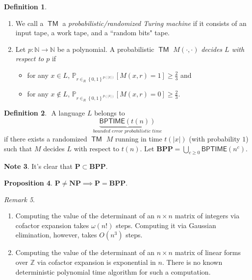 \documentclass[10pt,letterpaper,cm]{nupset}
\theoremstyle{definition}
\newtheorem{definition}{Definition}[subsection]
\newtheorem{note}[definition]{Note}
\theoremstyle{theorem}
\newtheorem{prop}[definition]{Proposition}
\theoremstyle{remark}
\newtheorem{remark}[definition]{Remark}
\newcommand{\N}{\mathbb N}
\newcommand{\Z}{\mathbb Z}
\newcommand{\1}{\mathbf{1}}
\newcommand{\0}{\vec 0}
\DeclareMathOperator{\TM}{\mathsf{TM}}
\begin{document}
\begin{definition} $ $
\begin{enumerate}
\item We call a $\TM$ a \textit{probabilistic/randomized Turing machine} if it consists of an input tape, a work tape, and a ``random bits" tape.  
\item Let $p: \N \to \N$ be a polynomial. A probabilistic $\TM$ $M({\cdot}, {\cdot})$ \textit{decides $L$ with respect to $p$} if 
\begin{itemize}
\item for any $x\in L$, $\mathbb{P}_{r\in_R \left\{0,1\right\}^{p(\left\lvert{x}\right\rvert)}}[M(x,r)=1] \geq \frac{2}{3}$ and
\item for any $x\notin L$, $\mathbb{P}_{r\in_R \left\{0,1\right\}^{p(\left\lvert{x}\right\rvert)}}[M(x,r)=0] \geq \frac{2}{3}$.
\end{itemize}
\end{enumerate}
\end{definition}

\begin{definition} $ $
A language $L$ belongs to $$\underbrace{\mathsf{BPTIME}(t(n))}_{\textit{bounded error probabilistic time}}$$ if there exists a randomized $\TM$ $M$ running in time $t(\left\lvert{x}\right\rvert)$ (with probability $1$) such that $M$ decides $L$ with respect to $t(n)$. Let $\mathbf{BPP}= \bigcup_{c\geq 0} \mathsf{BPTIME}(n^c)$.
\end{definition}

\begin{note}
It's clear that $\mathbf{P} \subset \mathbf{BPP}$.
\end{note}

\begin{prop}
$\mathbf{P} \ne \mathbf{NP} \implies \mathbf{P} = \mathbf{BPP}$.
\end{prop}

\bigskip

\begin{remark} $ $
\begin{enumerate}
\item Computing the value of the determinant of an $n\times n$ matrix of integers via cofactor expansion takes $\omega(n!)$ steps. Computing it via Gaussian elimination, however, takes $O\left(n^3\right)$ steps. 
\item Computing the value of the determinant of an $n\times n$ matrix of linear forms over $\Z$ via cofactor expansion is exponential in $n$. There is no known deterministic polynomial time algorithm for such a computation.
\end{enumerate}
\end{remark}
\end{document}
